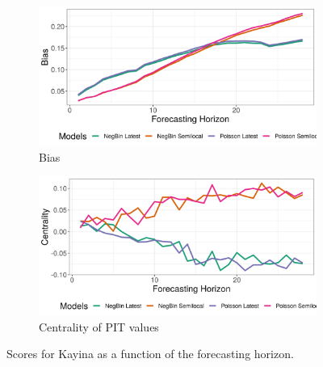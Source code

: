 \begin{figure}[H]
\begin{subfigure}{0.5\textwidth}
  \centering
  \includegraphics[width=\linewidth]{../output/Kayina_bias.png}  
  \caption{Bias}
  \label{fig:Kayina_scores_3}
\end{subfigure}
\begin{subfigure}{0.5\textwidth}
  \centering
  \includegraphics[width=\linewidth]{../output/Kayina_centrality.png}  
  \caption{Centrality of PIT values}
  \label{fig:Kayina_scores_4}
\end{subfigure}
  \caption{Scores for Kayina as a function of the forecasting horizon.}

  \label{fig:nat_scores}
\end{figure}
